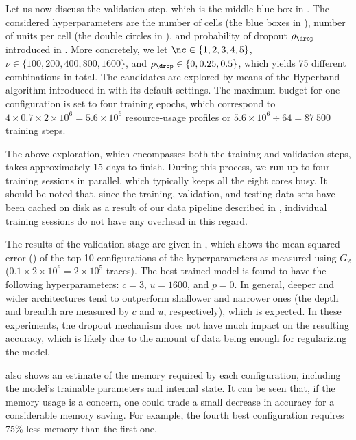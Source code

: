 Let us now discuss the validation step, which is the middle blue box in
. The considered hyperparameters are the number of cells
\nc (the blue boxes in ), number of units per cell \nu (the
double circles in ), and probability of dropout $\rho_\drop$
introduced in . More concretely, we let $\nc \in \{ 1, 2, 3,
4, 5 \}$, $\nu \in \{ 100, 200, 400, 800, 1600 \}$, and $\rho_\drop \in \{ 0,
0.25, 0.5 \}$, which yields 75 different combinations in total. The candidates
are explored by means of the Hyperband algorithm introduced in
 with its default settings. The maximum budget for one
configuration is set to four training epochs, which correspond to $4 \times 0.7
\times 2 \times 10^6 = 5.6 \times 10^6$ resource-usage profiles or $5.6 \times
10^6 \div 64 = 87~500$ training steps.

The above exploration, which encompasses both the training and validation steps,
takes approximately 15 days to finish. During this process, we run up to four
training sessions in parallel, which typically keeps all the eight cores busy.
It should be noted that, since the training, validation, and testing data sets
have been cached on disk as a result of our data pipeline described in
, individual training sessions do not have any overhead in
this regard.

The results of the validation stage are given in ,
which shows the mean squared error () of the top 10 configurations of
the hyperparameters as measured using $G_2$ ($0.1 \times 2 \times 10^6 = 2
\times 10^5$ traces). The best trained model is found to have the following
hyperparameters: $c = 3$, $u = 1600$, and $p = 0$. In general, deeper and wider
architectures tend to outperform shallower and narrower ones (the depth and
breadth are measured by $c$ and $u$, respectively), which is expected. In these
experiments, the dropout mechanism does not have much impact on the resulting
accuracy, which is likely due to the amount of data being enough for
regularizing the model.

 also shows an estimate of the memory required by each
configuration, including the model's trainable parameters and internal state. It
can be seen that, if the memory usage is a concern, one could trade a small
decrease in accuracy for a considerable memory saving. For example, the fourth
best configuration requires 75\% less memory than the first one.

